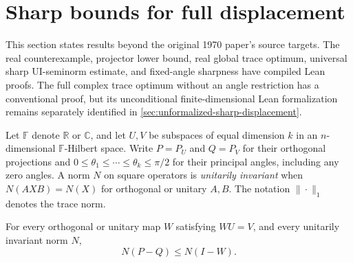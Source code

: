 \section{Sharp bounds for full displacement}
\label{sec:verified-sharp-displacement}

This section states results beyond the original 1970 paper's source targets.
The real counterexample, projector lower bound, real global trace optimum,
universal sharp UI-seminorm estimate, and fixed-angle sharpness have compiled
Lean proofs. The full complex trace optimum without an angle restriction
has a conventional proof, but its unconditional finite-dimensional Lean
formalization remains separately identified in
\cref{sec:unformalized-sharp-displacement}.

Let $\mathbb F$ denote $\mathbb R$ or $\mathbb C$, and let $U,V$ be subspaces
of equal dimension $k$ in an $n$-dimensional $\mathbb F$-Hilbert space.
Write $P=P_U$ and $Q=P_V$ for their orthogonal projections and
$0\leq\theta_1\leq\cdots\leq\theta_k\leq\pi/2$ for their
principal angles, including any zero angles. A norm $N$ on square operators
is \emph{unitarily invariant} when $N(AXB)=N(X)$ for orthogonal or unitary
$A,B$. The notation $\|\cdot\|_1$ denotes the trace norm.

\begin{proposition}
\label{prop:draft-projection-lower}
For every orthogonal or unitary map $W$ satisfying $WU=V$, and every
unitarily invariant norm $N$,
\begin{equation}
  N(P-Q)\leq N(I-W).
  \label{eq:draft-projection-lower}
\end{equation}
\end{proposition}

